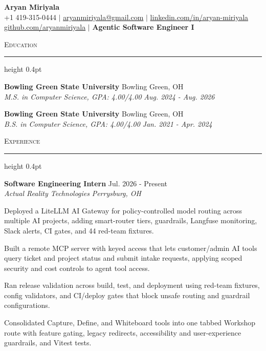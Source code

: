 \documentclass[letterpaper,11pt]{article}
\newcommand{\resumesection}[1]{%
  \par\vspace{2pt}%
  {\large\scshape #1}\par\vspace{2pt}%
  \hrule height 0.4pt\vspace{2pt}%
}
\newcommand{\resumeSubheading}[4]{
  \textbf{#1} \hfill #2\\
  \textit{#3} \hfill \textit{#4}
}
\begin{document}
\begin{center}
  {\LARGE \textbf{Aryan Miriyala}}\\[2pt]
  \small
  +1 419-315-0444 $|$ \href{mailto:aryanmiriyala@gmail.com}{aryanmiriyala@gmail.com} $|$ \href{https://www.linkedin.com/in/aryan-miriyala-7788a21b6/}{linkedin.com/in/aryan-miriyala}\\
  \href{https://github.com/aryanmiriyala}{github.com/aryanmiriyala} $|$ \textbf{Agentic Software Engineer I}
\end{center}\vspace{-6pt}

\resumesection{Education}
\resumeSubheading
{Bowling Green State University}{Bowling Green, OH}
{M.S. in Computer Science, GPA: 4.00/4.00}{Aug. 2024 - Aug. 2026}

\resumeSubheading
{Bowling Green State University}{Bowling Green, OH}
{B.S. in Computer Science, GPA: 4.00/4.00}{Jan. 2021 - Apr. 2024}

\resumesection{Experience}
\resumeSubheading
{Software Engineering Intern}{Jul. 2026 - Present}
{Actual Reality Technologies}{Perrysburg, OH}
\begin{tightitemize}
  \item Deployed a LiteLLM AI Gateway for policy-controlled model routing across multiple AI projects, adding smart-router tiers, guardrails, Langfuse monitoring, Slack alerts, CI gates, and 44 red-team fixtures.
  \item Built a remote MCP server with keyed access that lets customer/admin AI tools query ticket and project status and submit intake requests, applying scoped security and cost controls to agent tool access.
  \item Ran release validation across build, test, and deployment using red-team fixtures, config validators, and CI/deploy gates that block unsafe routing and guardrail configurations.
  \item Consolidated Capture, Define, and Whiteboard tools into one tabbed Workshop route with feature gating, legacy redirects, accessibility and user-experience guardrails, and Vitest tests.
\end{tightitemize}
\end{document}
